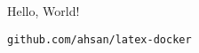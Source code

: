 \documentclass[12pt]{article}
\begin{document}
Hello, World!

\verb|github.com/ahsan/latex-docker|
\end{document}
